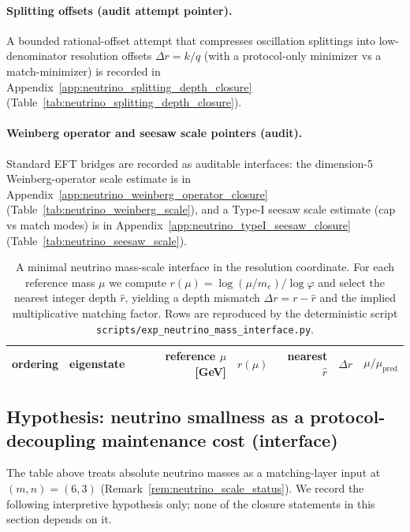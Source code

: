 \paragraph{Splitting offsets (audit attempt pointer).}
\AuditTag A bounded rational-offset attempt that compresses oscillation splittings into low-denominator resolution offsets $\Delta r=k/q$ (with a protocol-only minimizer vs a match-minimizer) is recorded in Appendix~\ref{app:neutrino_splitting_depth_closure} (Table~\ref{tab:neutrino_splitting_depth_closure}).

\paragraph{Weinberg operator and seesaw scale pointers (audit).}
\AuditTag Standard EFT bridges are recorded as auditable interfaces: the dimension-5 Weinberg-operator scale estimate is in Appendix~\ref{app:neutrino_weinberg_operator_closure} (Table~\ref{tab:neutrino_weinberg_scale}), and a Type-I seesaw scale estimate (cap vs match modes) is in Appendix~\ref{app:neutrino_typeI_seesaw_closure} (Table~\ref{tab:neutrino_seesaw_scale}).

\begin{table}[t]
\centering
\small
\setlength{\tabcolsep}{6pt}
\renewcommand{\arraystretch}{1.15}
\begin{tabular}{llrrrrr}
\toprule
ordering & eigenstate & reference $\mu$ [GeV] & $r(\mu)$ & nearest $\widehat r$ & $\Delta r$ & $\mu/\mu_{\mathrm{pred}}$ \\
\midrule
%
\end{tabular}
\caption{A minimal neutrino mass-scale interface in the resolution coordinate. For each reference mass $\mu$ we compute $r(\mu)=\log(\mu/m_e)/\log\varphi$ and select the nearest integer depth $\widehat r$, yielding a depth mismatch $\Delta r=r-\widehat r$ and the implied multiplicative matching factor. Rows are reproduced by the deterministic script \texttt{scripts/exp\_neutrino\_mass\_interface.py}.}
\label{tab:neutrino_mass_interface}
\end{table}

\subsection{Hypothesis: neutrino smallness as a protocol-decoupling maintenance cost (interface)}
\label{subsec:neutrino_interface_hypothesis}

\InterfaceTag The table above treats absolute neutrino masses as a matching-layer input at $(m,n)=(6,3)$ (Remark~\ref{rem:neutrino_scale_status}).
We record the following interpretive hypothesis only; none of the closure statements in this section depends on it.

